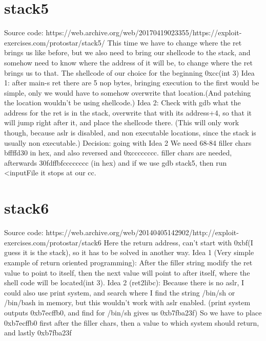 \documentclass[11pt,a4paper]{article}
\begin{document}
\section*{stack5}
\markright{}
Source code:\newline
https://web.archive.org/web/20170419023355/https://exploit-exercises.com/protostar/stack5/\newline
This time we have to change where the ret brings us like before, but we also need to bring our shellcode to the stack, and somehow need to know where the address of it will be, to change where the ret brings us to that.\newline
The shellcode of our choice for the beginning 0xcc(int 3)\newline
Idea 1: after main-s ret there are 5 nop bytes, bringing execution to the first would be simple, only we would have to somehow overwrite that location.(And patching the location wouldn't be using shellcode.)
Idea 2: Check with gdb what the address for the ret is in the stack, overwrite that with its address+4, so that it will jump right after it, and place the shellcode there.\newline
(This will only work though, because aslr is disabled, and non executable locations, since the stack is usually non executable.)\newline
Decision: going with Idea 2\newline
We need 68-84 filler chars bffffd30 in hex, and also reversed and 0xcccccccc. filler chars are needed, afterwards 30fdffbfcccccccc (in hex) and if we use gdb stack5, then run <inputFile it stops at our cc.
\section*{stack6}
\markright{}
Source code:\newline
https://web.archive.org/web/20140405142902/http://exploit-exercises.com/protostar/stack6\newline
Here the return address, can't start with 0xbf(I guess it is the stack), so it has to be solved in another way.\newline
Idea 1 (Very simple example of return oriented programming): After the filler string modify the ret value to point to itself, then the next value will point to after itself, where the shell code will be located(int 3).\newline
Idea 2 (ret2libc): Because there is no aslr, I could also use print system, and search where I find the string /bin/sh or /bin/bash in memory, but this wouldn't work with aslr enabled.\newline
(print system outputs 0xb7ecffb0, and find for /bin/sh gives us 0xb7fba23f)\newline
So we have to place 0xb7ecffb0 first after the filler chars, then a value to which system should return, and lastly 0xb7fba23f\newline
\end{document}
